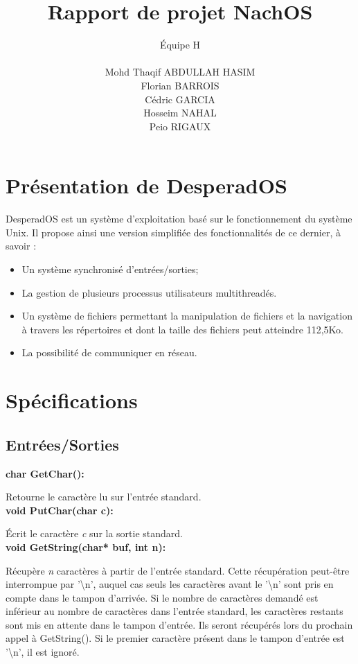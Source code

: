 \documentclass[12pt]{report}
\title{Rapport de projet NachOS}
\author{
\'Equipe H\\\\
Mohd Thaqif ABDULLAH HASIM\\
Florian BARROIS\\
Cédric GARCIA\\
Hosseim NAHAL\\
Peio RIGAUX\\
}
\begin{document}
\maketitle


\chapter{Présentation de DesperadOS}

DesperadOS est un système d'exploitation basé sur le fonctionnement du système Unix. Il propose ainsi une version simplifiée des fonctionnalités de ce dernier, à savoir :
\begin{itemize}\renewcommand{\labelitemi}{$\bullet$}
\item Un système synchronisé d'entrées/sorties;
\item La gestion de plusieurs processus utilisateurs multithreadés.
\item Un système de fichiers permettant la manipulation de fichiers et la navigation à travers les répertoires et dont la taille des fichiers peut atteindre 112,5Ko.
\item La possibilité de communiquer en réseau.

\end{itemize}


\chapter{Spécifications}
\section{Entrées/Sorties}
\bigskip
\textbf{char GetChar():}

Retourne le caractère lu sur l'entrée standard.\\

\bigskip
\textbf{void PutChar(char c):}

Écrit le caractère \textit{c} sur la sortie standard.\\


\bigskip
\textbf{void GetString(char* buf, int n):}
 
Récupère \textit{n} caractères à partir de l'entrée standard. Cette récupération peut-être interrompue par '\textbackslash n',
auquel cas seuls les caractères avant le '\textbackslash n' sont pris en compte dans le tampon d'arrivée.
Si le nombre de caractères demandé est inférieur au nombre de caractères dans l'entrée standard, les caractères
restants sont mis en attente dans le tampon d'entrée. Ils seront récupérés lors du prochain appel à GetString().
Si le premier caractère présent dans le tampon d'entrée est '\textbackslash n', il est ignoré.
\end{document}
